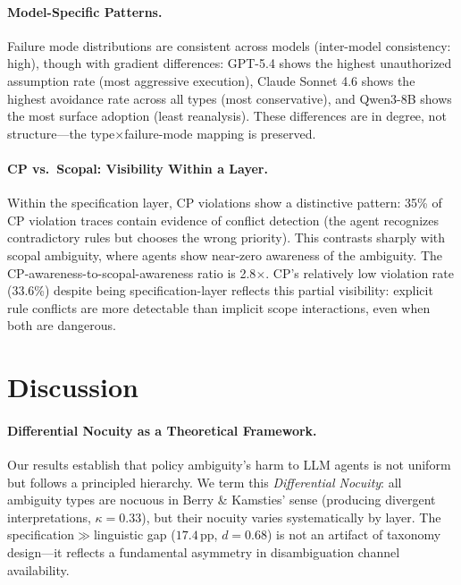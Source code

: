 \documentclass[11pt]{article}
\newcommand{\pp}{\,\text{pp}}
\begin{document}
\paragraph{Model-Specific Patterns.}
Failure mode distributions are consistent across models (inter-model consistency: high), though with gradient differences: GPT-5.4 shows the highest unauthorized assumption rate (most aggressive execution), Claude Sonnet 4.6 shows the highest avoidance rate across all types (most conservative), and Qwen3-8B shows the most surface adoption (least reanalysis). These differences are in degree, not structure---the type$\times$failure-mode mapping is preserved.

\paragraph{CP vs.\ Scopal: Visibility Within a Layer.}
Within the specification layer, CP violations show a distinctive pattern: 35\% of CP violation traces contain evidence of conflict detection (the agent recognizes contradictory rules but chooses the wrong priority). This contrasts sharply with scopal ambiguity, where agents show near-zero awareness of the ambiguity. The CP-awareness-to-scopal-awareness ratio is 2.8$\times$. CP's relatively low violation rate (33.6\%) despite being specification-layer reflects this partial visibility: explicit rule conflicts are more detectable than implicit scope interactions, even when both are dangerous.

\section{Discussion}

\paragraph{Differential Nocuity as a Theoretical Framework.}
Our results establish that policy ambiguity's harm to LLM agents is not uniform but follows a principled hierarchy. We term this \textit{Differential Nocuity}: all ambiguity types are nocuous in Berry \& Kamsties' sense (producing divergent interpretations, $\kappa=0.33$), but their nocuity varies systematically by layer. The specification$\gg$linguistic gap ($17.4\pp$, $d=0.68$) is not an artifact of taxonomy design---it reflects a fundamental asymmetry in disambiguation channel availability.
\end{document}
